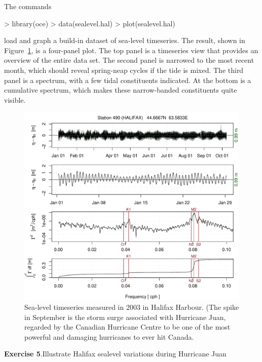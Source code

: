 \documentclass{article}
\newcommand{\workedexercise}[2]{
	\vspace{2ex plus 2ex minus 1ex}
	\begin{boxedminipage}[c]{0.95\linewidth}
		{\textbf{Exercise #1}.\hspace{1em}#2}
	\end{boxedminipage}
	\vspace{2ex plus 2ex minus 1ex}
}
\begin{document}
The commands
\begin{Schunk}
\begin{Sinput}
> library(oce)
> data(sealevel.hal)
> plot(sealevel.hal)
\end{Sinput}
\end{Schunk}
load and graph a build-in dataset of sea-level timeseries. The result, shown in
Figure~\ref{fig:sealevel}, is a four-panel plot. The top panel is a timeseries
view that provides an overview of the entire data set. The second panel is
narrowed to the most recent month, which should reveal spring-neap cycles if the
tide is mixed. The third panel is a spectrum, with a few tidal constituents
indicated. At the bottom is a cumulative spectrum, which makes these
narrow-banded constituents quite visible.

\begin{figure}
\begin{center}
\includegraphics{oce-sealevelfig}
\end{center}
\caption{Sea-level timeseries measured in 2003 in Halifax Harbour.  (The spike
in September is the storm surge associated with Hurricane Juan, regarded by the
Canadian Hurricane Centre to be one of the most powerful and damaging hurricanes
to ever hit Canada.}
\label{fig:sealevel}
\end{figure}

\workedexercise{5}{Illustrate Halifax sealevel variations during Hurricane Juan}
\end{document}
